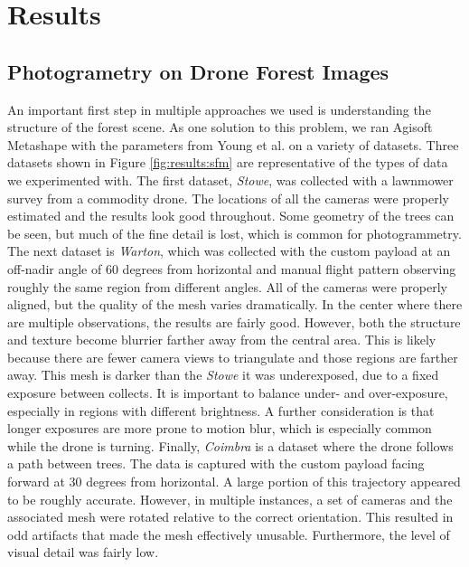 \chapter{Results} \label{chapResults}
\section{Photogrametry on Drone Forest Images}
An important first step in multiple approaches we used is understanding the structure of the forest scene. As one solution to this problem, we ran Agisoft Metashape with the parameters from Young et al. \cite{Young2022} on a variety of datasets. Three datasets shown in Figure \ref{fig:results:sfm} are representative of the types of data we experimented with. The first dataset, \textit{Stowe}, was collected with a lawnmower survey from a commodity drone. The locations of all the cameras were properly estimated and the results look good throughout. Some geometry of the trees can be seen, but much of the fine detail is lost, which is common for photogrammetry. The next dataset is \textit{Warton}, which was collected with the custom payload at an off-nadir angle of 60 degrees from horizontal and manual flight pattern observing roughly the same region from different angles. All of the cameras were properly aligned, but the quality of the mesh varies dramatically. In the center where there are multiple observations, the results are fairly good. However, both the structure and texture become blurrier farther away from the central area. This is likely because there are fewer camera views to triangulate and those regions are farther away. This mesh is darker than the \textit{Stowe} it was underexposed, due to a fixed exposure between collects. It is important to balance under- and over-exposure, especially in regions with different brightness. A further consideration is that longer exposures are more prone to motion blur, which is especially common while the drone is turning.
Finally, \textit{Coimbra} is a dataset where the drone follows a path between trees. The data is captured with the custom payload facing forward at 30 degrees from horizontal. A large portion of this trajectory appeared to be roughly accurate. However, in multiple instances, a set of cameras and the associated mesh were rotated relative to the correct orientation. This resulted in odd artifacts that made the mesh effectively unusable. Furthermore, the level of visual detail was fairly low.



